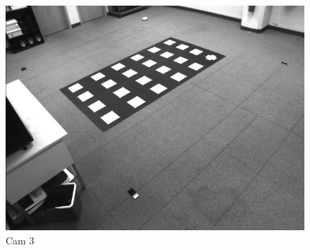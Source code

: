 \documentclass{article}
\begin{document}
\begin{enumerate}
\begin{figure}[!htb]
    \centering
  		\includegraphics[scale=0.6]{CalImage_3.png}
  		\caption{Cam 3}
  		\label{Fig4}
 \end{figure}


\end{enumerate}
\end{document}
